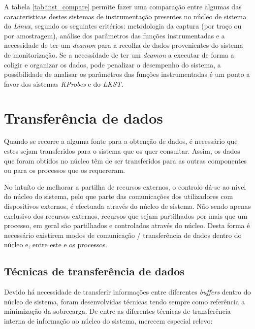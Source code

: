 
A tabela \ref{tab:inst_compare} permite fazer uma comparação entre algumas das caracteristicas destes sistemas de instrumentação presentes no núcleo de sistema do \textit{Linux}, segundo os seguintes critérios: metodologia da captura (por traço ou por amostragem), análise dos parâmetros das funções instrumentadas e a necessidade de ter um \textit{deamon} para a recolha de dados provenientes do sistema de monitorização.
Se a necessidade de ter um \textit{deamon} a executar de forma a coligir e organizar os dados, pode penalizar o desempenho do sistema, a possibilidade de analisar os parâmetros das funções instrumentadas é um ponto a favor dos sistemas \textit{KProbes} e do \textit{LKST}.



\section{Transferência de dados}
\label{sect:kernel_user_comm}


Quando se recorre a alguma fonte para a obtenção de dados, é necessário que estes sejam transferidos para o sistema que os quer consultar.
Assim, os dados que foram obtidos no núcleo têm de ser transferidos para as outras componentes ou para os processos que os requereram.

No intuíto de melhorar a partilha de recursos externos, o controlo dá-se ao nível do núcleo do sistema, pelo que parte das comunicações dos utilizadores com dispositivos externos, é efectuada através do núcleo de sistema.
Não sendo apenas exclusivo dos recursos externos, recursos que sejam partilhados por mais que um processo, em geral são partilhados e controlados através do núcleo.
Desta forma é necessário existirem modos de comunicação / transferência de dados dentro do núcleo e, entre este e os processos.

\subsection{Técnicas de transferência de dados}

Devido há necessidade de transferir informações entre diferentes \textit{buffers} dentro do núcleo de sistema, foram desenvolvidas técnicas tendo sempre como referência a minimização da sobrecarga.
De entre as diferentes técnicas de transferência interna de informação ao núcleo do sistema, merecem especial relevo:

